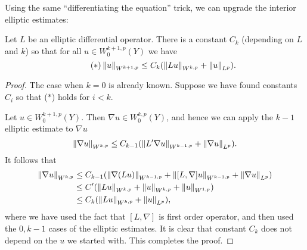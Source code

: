    Using the same ``differentiating the equation'' trick, we can
   upgrade the interior elliptic estimates:
   \begin{thm}
     Let $L$ be an elliptic differential operator. There is a constant
     $C_{k}$ (depending on $L$ and $k$) so that for all
     $u\in W^{k+1,p}_{0}(Y)$ we have
     \begin{equation*}\tag{$\ast$}
       \left\lVert u\right\rVert_{W^{k+1,p}}\le C_{k}(\left\lVert Lu\right\rVert_{W^{k,p}}+\left\lVert u\right\rVert_{L^{p}}).
     \end{equation*}
   \end{thm}
   \begin{proof}
     The case when $k=0$ is already known. Suppose we have found
     constants $C_{i}$ so that ($\ast$) holds for $i<k$.

     Let $u\in W^{k+1,p}_{0}(Y)$. Then $\nabla u\in W^{k,p}_{0}(Y)$,
     and hence we can apply the $k-1$ elliptic estimate to $\nabla u$
     \begin{equation*}
       \left\lVert\nabla u\right\rVert_{W^{k,p}}\le C_{k-1}(\left\lVert L'\nabla
         u\right\rVert_{W^{k-1,p}}+\left\lVert\nabla u\right\rVert_{L^{p}}).
     \end{equation*}
     It follows that
     \begin{equation*}
       \begin{aligned}
       \left\lVert\nabla u\right\rVert_{W^{k,p}}&\le C_{k-1}(\left\lVert\nabla
         (Lu)\right\rVert_{W^{k-1,p}}+\left\lVert[L,\nabla]u\right\rVert_{W^{k-1,p}}+\left\lVert\nabla
         u\right\rVert_{L^{p}})\\
       &\le
       C'(\left\lVert Lu\right\rVert_{W^{k,p}}+\left\lVert u\right\rVert_{W^{k,p}}+\left\lVert u\right\rVert_{W^{1,p}})\\
       &\le C_{k}(\left\lVert Lu\right\rVert_{W^{k,p}}+\left\lVert u\right\rVert_{L^{p}}),
     \end{aligned}     
   \end{equation*}
   where we have used the fact that $[L,\nabla]$ is first order
   operator, and then used the $0,k-1$ cases of the elliptic
   estimates. It is clear that constant $C_{k}$ does not depend on the
   $u$ we started with. This completes the proof.   
 \end{proof}
